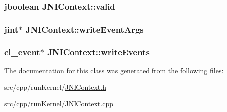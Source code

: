 \hypertarget{class_j_n_i_context_a09f80fadd22c3cf5ea45ed979814c1df}{
\subsubsection[{valid}]{\setlength{\rightskip}{0pt plus 5cm}jboolean J\-N\-I\-Context\-::valid\hspace{0.3cm}{\ttfamily [private]}}}\label{class_j_n_i_context_a09f80fadd22c3cf5ea45ed979814c1df}
\hypertarget{class_j_n_i_context_aabad08832385c27215438477ec4a9429}{
\subsubsection[{write\-Event\-Args}]{\setlength{\rightskip}{0pt plus 5cm}jint$\ast$ J\-N\-I\-Context\-::write\-Event\-Args}}\label{class_j_n_i_context_aabad08832385c27215438477ec4a9429}
\hypertarget{class_j_n_i_context_a4b7bcfab666ec64a24ddc5c389fbc3c0}{
\subsubsection[{write\-Events}]{\setlength{\rightskip}{0pt plus 5cm}cl\-\_\-event$\ast$ J\-N\-I\-Context\-::write\-Events}}\label{class_j_n_i_context_a4b7bcfab666ec64a24ddc5c389fbc3c0}


The documentation for this class was generated from the following files\-:\begin{DoxyCompactItemize}
\item 
src/cpp/run\-Kernel/\hyperlink{_j_n_i_context_8h}{J\-N\-I\-Context.\-h}\item 
src/cpp/run\-Kernel/\hyperlink{_j_n_i_context_8cpp}{J\-N\-I\-Context.\-cpp}\end{DoxyCompactItemize}
